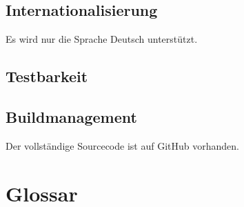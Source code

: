 \documentclass[pdftex,12pt,a4paper]{article}
\begin{document}
\subsection{Internationalisierung}
Es wird nur die Sprache Deutsch unterst\"utzt.
\subsection{Testbarkeit}
\subsection{Buildmanagement}
Der vollst\"andige Sourcecode ist auf GitHub vorhanden.
\section{Glossar}
\end{document}
